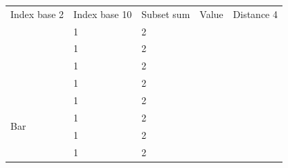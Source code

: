 \documentclass[12pt]{extarticle}
\begin{document}
\begin{tabular}{| m{2.4cm} | m{2.4cm} | m{3cm} | m{2.2cm} | m{2.2cm} |}
\hline
 Index base 2 & Index base 10 & Subset sum & Value & Distance 4\\
 & 1 & 2 \multirow{4}{*}{Foo}\\
    & 1 & 2 \\
    \cline{2-3}
    & 1 & 2 \\
    & 1 & 2 \\
    \hline
\multirow{4}{*}{Bar} & 1 & 2 \\
    & 1 & 2 \\
    \cline{2-3}
    & 1 & 2 \\
    & 1 & 2 \\
    \hline
\end{tabular}


\clearpage

\end{document}
